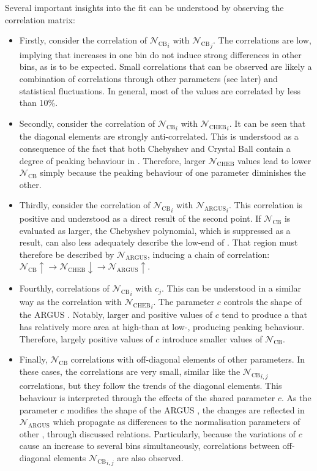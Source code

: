 Several important insights into the fit can be understood by observing the correlation matrix:
\begin{itemize}
\item
Firstly, consider the correlation of ${\mathcal{N}_{\mathrm{CB}}}_{i}$ with ${\mathcal{N}_{\mathrm{CB}}}_{j}$.
The correlations are low, implying that increases in one bin do not induce strong differences in other bins, as is to be expected.
Small correlations that can be observed are likely a combination of correlations through other parameters (see later) and statistical fluctuations.
In general, most of the values are correlated by less than 10\%.
\item Secondly, consider the correlation of ${\mathcal{N}_{\mathrm{CB}}}_{i}$ with ${\mathcal{N}_{\mathrm{CHEB}}}_{i}$.
It can be seen that the diagonal elements are strongly anti-correlated.
This is understood as a consequence of the fact that both Chebyshev and Crystal Ball  contain a degree of peaking behaviour in \Mbc.
Therefore, larger $\mathcal{N}_{\mathrm{CHEB}}$ values lead to lower ${\mathcal{N}_{\mathrm{CB}}}$ simply because the peaking behaviour of one parameter diminishes the other.
\item Thirdly, consider the correlation of ${\mathcal{N}_{\mathrm{CB}}}_i$ with ${\mathcal{N}_{\mathrm{ARGUS}}}_i$.
This correlation is positive and understood as a direct result of the second point.
If $\mathcal{N}_{\mathrm{CB}}$ is evaluated as larger, the Chebyshev polynomial, which is suppressed as a result, can also less adequately describe the low-end of \Mbc.
That region must therefore be described by $\mathcal{N}_{\mathrm{ARGUS}}$, inducing a chain of correlation: $\mathcal{N}_{\mathrm{CB}}\uparrow\rightarrow{\mathcal{N}_{\mathrm{CHEB}}}\downarrow\rightarrow\mathcal{N}_{\mathrm{ARGUS}}\uparrow$.
\item Fourthly, correlations of ${\mathcal{N}_{\mathrm{CB}}}_i$ with $c_j$.
This can be understood in a similar way as the correlation with ${\mathcal{N}_{\mathrm{CHEB}}}_i$.
The parameter $c$ controls the shape of the ARGUS .
Notably, larger and positive values of $c$ tend to produce a \PDF that has relatively more area at high-\Mbc than at low-\Mbc, producing peaking behaviour.
Therefore, largely positive values of $c$ introduce smaller values of $\mathcal{N}_{\mathrm{CB}}$.
\item Finally, $\mathcal{N}_{\mathrm{CB}}$ correlations with off-diagonal elements of other parameters.
In these cases, the correlations are very small, similar like the ${\mathcal{N}_{\mathrm{CB}}}_{i,j}$ correlations, but they follow the trends of the diagonal elements.
This behaviour is interpreted through the effects of the shared parameter $c$.
As the parameter $c$ modifies the shape of the ARGUS \PDF, the changes are reflected in $\mathcal{N}_{\mathrm{ARGUS}}$ which propagate as differences to the normalisation parameters of other , through discussed relations.
Particularly, because the variations of $c$ cause an increase to several bins simultaneously, correlations between off-diagonal elements ${\mathcal{N}_{\mathrm{CB}}}_{i,j}$ are also observed.
\end{itemize}

